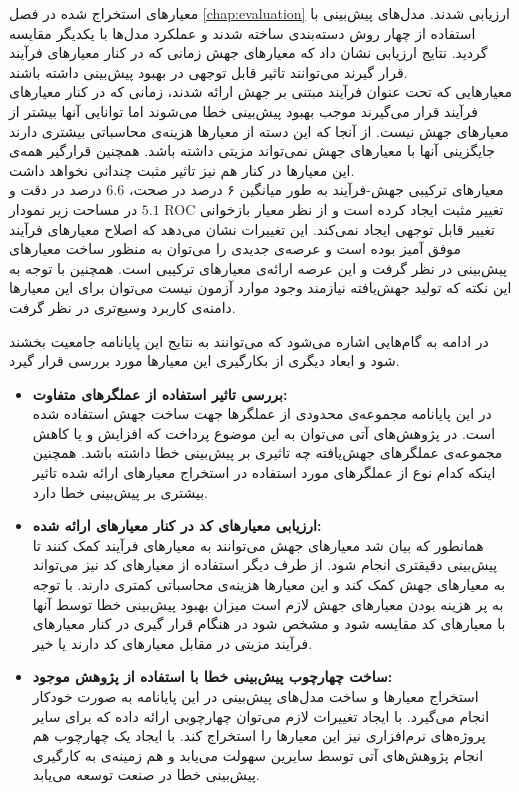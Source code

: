 معیارهای استخراج شده در فصل \ref{chap:evaluation} ارزیابی شدند.  مدل‌های پیش‌بینی با استفاده از  چهار روش دسته‌بندی ساخته شدند و عملکرد مدل‌ها با یکدیگر مقایسه گردید. نتایج ارزیابی نشان داد که معیارهای جهش زمانی که در کنار معیارهای فرآیند قرار گیرند می‌توانند تاثیر قابل توجهی در بهبود پیش‌بینی داشته باشند.\\
 معیارهایی که تحت عنوان فرآیند مبتنی بر جهش ارائه شدند، زمانی که در کنار معیارهای فرآیند قرار می‌گیرند موجب بهبود پیش‌بینی خطا می‌شوند اما توانایی آنها بیشتر از معیارهای جهش نیست. از آنجا که این دسته از معیارها هزینه‌ی محاسباتی بیشتری دارند جایگزینی آنها با معیارهای جهش نمی‌تواند مزیتی داشته باشد. همچنین قرارگیر همه‌ی این معیارها در کنار هم نیز تاثیر مثبت چندانی نخواهد داشت.\\
 معیارهای ترکیبی جهش-فرآیند به طور میانگین ۶ درصد در صحت، $6.6$ درصد در دقت و $5.1$ در مساحت زیر نمودار ROC تغییر مثبت ایجاد کرده است و از نظر معیار بازخوانی تغییر قابل توجهی ایجاد نمی‌کند. این تغییرات نشان می‌دهد که اصلاح  معیارهای فرآیند موفق آمیز بوده است و عرصه‌ی جدیدی را می‌توان به منظور ساخت معیارهای پیش‌بینی در نظر گرفت و این عرصه ارائه‌ی معیارهای ترکیبی است. همچنین با توجه به این نکته  که تولید جهش‌یافته نیازمند وجود موارد آزمون نیست می‌توان برای این معیارها دامنه‌ی کاربرد وسیع‌تری در نظر گرفت. 

در ادامه به گام‌هایی اشاره می‌شود که می‌توانند  به نتایج این پایانامه   جامعیت بخشند شود و ابعاد دیگری از بکارگیری این معیارها  مورد بررسی قرار گیرد.

\begin{itemize}
	\item
	\textbf{بررسی تاثیر استفاده از عملگرهای متفاوت:}\\
	در این پایانامه مجموعه‌ی محدودی از عملگرها جهت ساخت جهش استفاده شده است. در پژوهش‌های آتی می‌توان به این موضوع پرداخت که افزایش و یا  کاهش مجموعه‌ی عملگرهای جهش‌یافته چه تاثیری بر پیش‌بینی خطا داشته باشد. همچنین اینکه کدام نوع از عملگرهای مورد استفاده در استخراج معیارهای ارائه شده تاثیر بیشتری بر پیش‌بینی خطا دارد. 
	\item
	\textbf{ارزیابی معیارهای کد در کنار معیارهای ارائه شده:}\\
همانطور که بیان شد معیارهای جهش می‌توانند به معیارهای فرآیند کمک کنند تا پیش‌بینی دقیقتری انجام شود. از طرف دیگر استفاده از معیارهای کد نیز می‌تواند به معیارهای جهش کمک کند و این معیارها هزینه‌ی محاسباتی کمتری دارند. با توجه به پر هزینه بودن معیارهای جهش لازم است میزان بهبود پیش‌بینی  خطا توسط آنها با معیارهای کد مقایسه شود و مشخص شود  در هنگام قرار گیری در کنار معیارهای فرآیند مزیتی در مقابل معیارهای کد دارند یا خیر. 
\item
\textbf{ساخت چهارچوب پیش‌بینی خطا با استفاده از پژوهش موجود:}\\
استخراج معیارها و ساخت مدل‌های پیش‌بینی در این پایانامه به صورت خودکار انجام می‌گیرد. با ایجاد تغییرات لازم می‌توان چهارچوبی ارائه داده که برای سایر پروژه‌های نرم‌افزاری نیز این معیارها را استخراج کند. با ایجاد یک چهارچوب هم انجام پژوهش‌های آتی توسط سایرین سهولت می‌یابد و هم زمینه‌ی به کارگیری پیش‌بینی خطا در صنعت توسعه می‌یابد. 
	
	
\end{itemize}




